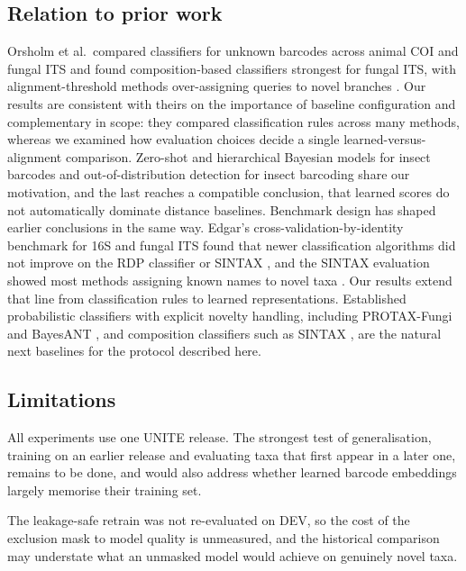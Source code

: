 \documentclass[11pt]{article}
\begin{document}
\subsection{Relation to prior work}
Orsholm et al.\ compared classifiers for unknown barcodes across animal COI and
fungal ITS and found composition-based classifiers strongest for fungal ITS,
with alignment-threshold methods over-assigning queries to novel branches
\cite{orsholm2026unseen}. Our results are consistent with theirs on the
importance of baseline configuration and complementary in scope: they compared
classification rules across many methods, whereas we examined how evaluation
choices decide a single learned-versus-alignment comparison. Zero-shot and
hierarchical Bayesian models for insect barcodes
\cite{badirli2021zeroshot,badirli2023classifying} and out-of-distribution
detection for insect barcoding \cite{fujisawa2026ood} share our motivation, and
the last reaches a compatible conclusion, that learned scores do not
automatically dominate distance baselines. Benchmark design has shaped earlier conclusions in the same way. Edgar's
cross-validation-by-identity benchmark for 16S and fungal ITS found that
newer classification algorithms did not improve on the RDP classifier or
SINTAX \cite{edgar2018accuracy}, and the SINTAX evaluation showed most methods
assigning known names to novel taxa \cite{edgar2016sintax}. Our results extend
that line from classification rules to learned representations. Established
probabilistic classifiers with explicit novelty handling, including PROTAX-Fungi
\cite{abarenkov2018protax} and BayesANT \cite{zito2023bayesant}, and
composition classifiers such as SINTAX \cite{edgar2016sintax}, are the natural
next baselines for the protocol described here.

\subsection{Limitations}
\label{sec:limitations}
All experiments use one UNITE release. The strongest test of generalisation,
training on an earlier release and evaluating taxa that first appear in a later
one, remains to be done, and would also address whether learned barcode
embeddings largely memorise their training set.

The leakage-safe retrain was not re-evaluated on DEV, so the cost of the
exclusion mask to model quality is unmeasured, and the historical comparison may
understate what an unmasked model would achieve on genuinely novel taxa.
\end{document}

